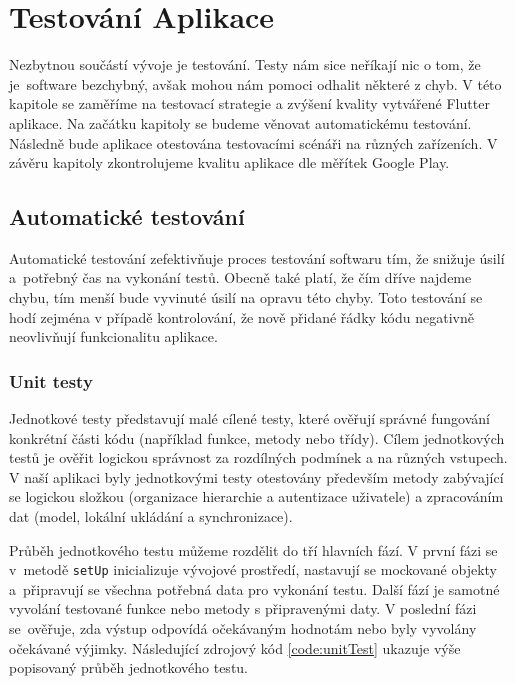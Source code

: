\documentclass[czech, bc, kiv, he, iso690numb]{fasthesis}
\begin{document}
\chapter{Testování Aplikace} \label{chap:testing}

Nezbytnou součástí vývoje je testování. Testy nám sice neříkají nic o tom, že je~software bezchybný, avšak mohou nám pomoci odhalit některé z chyb. V této kapitole se zaměříme na testovací strategie a zvýšení kvality vytvářené Flutter aplikace. Na začátku kapitoly se budeme věnovat automatickému testování. Následně bude aplikace otestována testovacími scénáři na různých zařízeních. V závěru kapitoly zkontrolujeme kvalitu aplikace dle měřítek Google Play.


\section{Automatické testování}

Automatické testování zefektivňuje proces testování softwaru tím, že snižuje úsilí a~potřebný čas na vykonání testů. Obecně také platí, že čím dříve najdeme chybu, tím menší bude vyvinuté úsilí na opravu této chyby. Toto testování se hodí zejména v případě kontrolování, že nově přidané řádky kódu negativně neovlivňují funkcionalitu aplikace.

\subsection{Unit testy}

Jednotkové testy představují malé cílené testy, které ověřují správné fungování konkrétní části kódu (například funkce, metody nebo třídy). Cílem jednotkových testů je ověřit logickou správnost za rozdílných podmínek a na různých vstupech. V naší aplikaci byly jednotkovými testy otestovány především metody zabývající se logickou složkou (organizace hierarchie a autentizace uživatele) a zpracováním dat (model, lokální ukládání a synchronizace).

Průběh jednotkového testu můžeme rozdělit do tří hlavních fází. V první fázi se v~metodě \texttt{setUp} inicializuje vývojové prostředí, nastavují se mockované objekty a~připravují se všechna potřebná data pro vykonání testu. Další fází je samotné vyvolání testované funkce nebo metody s připravenými daty. V poslední fázi se~ověřuje, zda výstup odpovídá očekávaným hodnotám nebo byly vyvolány očekávané výjimky.
Následující zdrojový kód \ref{code:unitTest} ukazuje výše popisovaný průběh jednotkového testu.%
\end{document}
